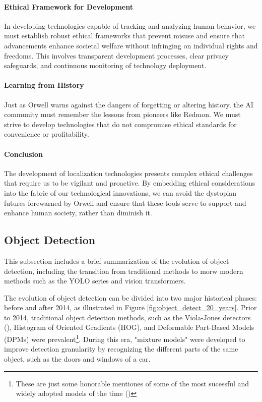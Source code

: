 
\paragraph{Ethical Framework for Development}
In developing technologies capable of tracking and analyzing human behavior, we must establish robust ethical frameworks that prevent misuse and ensure that advancements enhance societal welfare without infringing on individual rights and freedoms. This involves transparent development processes, clear privacy safeguards, and continuous monitoring of technology deployment.

\paragraph{Learning from History}
Just as Orwell warns against the dangers of forgetting or altering history, the AI community must remember the lessons from pioneers like Redmon. We must strive to develop technologies that do not compromise ethical standards for convenience or profitability.

\paragraph{Conclusion}
The development of localization technologies presents complex ethical challenges that require us to be vigilant and proactive. By embedding ethical considerations into the fabric of our technological innovations, we can avoid the dystopian futures forewarned by Orwell and ensure that these tools serve to support and enhance human society, rather than diminish it.

\subsection{Object Detection}
\label{sec:object_detection}
This subsection includes a brief summarization of the evolution of object detection, including the transition from traditional methods to morw modern methods such as the YOLO series and vision transformers.

The evolution of object detection can be divided into two major historical phases: before and after 2014, as illustrated in Figure \ref{fig:object_detect_20_years}. Prior to 2014, traditional object detection methods, such as the Viola-Jones detectors (\cite{vi2001viola-jones-orig}), Histogram of Oriented Gradients (HOG), and Deformable Part-Based Models (DPMs) were prevalent\footnote{These are just some honorable mentiones of some of the most sucessful and widely adopted models of the time (\cite{li2012violajonessuccessful})}. During this era, "mixture models" were developed to improve detection granularity by recognizing the different parts of the same object, such as the doors and windows of a car.

